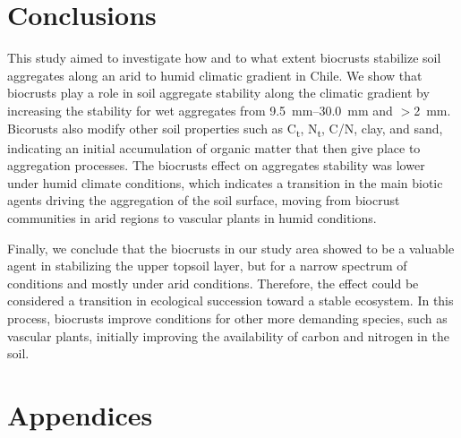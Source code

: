 \section{Conclusions}

This study aimed to investigate how and to what extent biocrusts stabilize soil aggregates along an arid to humid climatic gradient in Chile. We show that biocrusts play a role in soil aggregate stability along the climatic gradient by increasing the stability for wet aggregates from \SIrange[range-units=single]{9.5}{30.0}{\milli\meter} and $>$\SI{2}{\milli\meter}. Bicorusts also modify other soil properties such as C\textsubscript{t}, N\textsubscript{t}, C/N, clay, and sand, indicating an initial accumulation of organic matter that then give place to aggregation processes. The biocrusts effect on aggregates stability was lower under humid climate conditions, which indicates a transition in the main biotic agents driving the aggregation of the soil surface, moving from biocrust communities in arid regions to vascular plants in humid conditions.

Finally, we conclude that the biocrusts in our study area showed to be a valuable agent in stabilizing the upper topsoil layer, but for a narrow spectrum of conditions and mostly under arid conditions. Therefore, the effect could be considered a transition in ecological succession toward a stable ecosystem. In this process, biocrusts improve conditions for other more demanding species, such as vascular plants, initially improving the availability of carbon and nitrogen in the soil.

\section*{Appendices}

